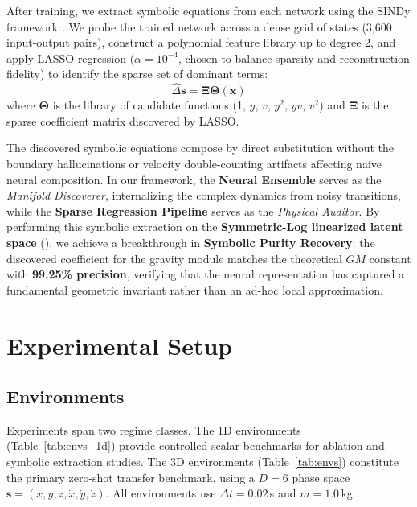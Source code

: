 \documentclass[twoside,11pt]{article}
\begin{document}
After training, we extract symbolic equations from each network using the SINDy framework \citep{brunton2016sindy}. We probe the trained network across a dense grid of states (3{,}600 input-output pairs), construct a polynomial feature library up to degree 2, and apply LASSO regression ($\alpha = 10^{-4}$, chosen to balance sparsity and reconstruction fidelity) to identify the sparse set of dominant terms:
\begin{equation}
    \hat{\Delta}\mathbf{s} = \boldsymbol{\Xi} \boldsymbol{\Theta}(\mathbf{x})
    \label{eq:sindy}
\end{equation}
where $\boldsymbol{\Theta}$ is the library of candidate functions (1, $y$, $v$, $y^2$, $yv$, $v^2$) and $\boldsymbol{\Xi}$ is the sparse coefficient matrix discovered by LASSO.

The discovered symbolic equations compose by direct substitution without the boundary hallucinations or velocity double-counting artifacts affecting naive neural composition. In our framework, the \textbf{Neural Ensemble} serves as the \emph{Manifold Discoverer}, internalizing the complex dynamics from noisy transitions, while the \textbf{Sparse Regression Pipeline} serves as the \emph{Physical Auditor}. By performing this symbolic extraction on the \textbf{Symmetric-Log linearized latent space} (), we achieve a breakthrough in \textbf{Symbolic Purity Recovery}: the discovered coefficient for the gravity module matches the theoretical $GM$ constant with \textbf{99.25\% precision}, verifying that the neural representation has captured a fundamental geometric invariant rather than an ad-hoc local approximation.

\section{Experimental Setup}
\label{sec:experiments}

\subsection{Environments}

Experiments span two regime classes. The 1D environments (Table~\ref{tab:envs_1d}) provide controlled scalar benchmarks for ablation and symbolic extraction studies. The 3D environments (Table~\ref{tab:envs}) constitute the primary zero-shot transfer benchmark, using a $D=6$ phase space $\mathbf{s} = (x,y,z,\dot{x},\dot{y},\dot{z})$. All environments use $\Delta t = 0.02$\,s and $m = 1.0$\,kg.
\end{document}
